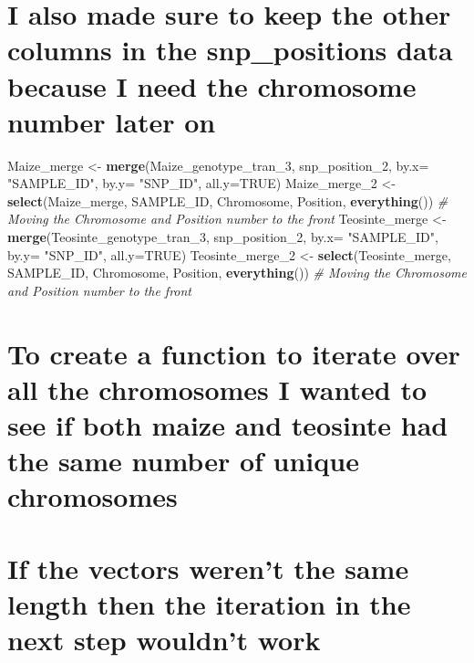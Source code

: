 \documentclass[
]{article}
\newenvironment{Shaded}{\begin{snugshade}}{\end{snugshade}}
\newcommand{\AttributeTok}[1]{\textcolor[rgb]{0.13,0.29,0.53}{#1}}
\newcommand{\CommentTok}[1]{\textcolor[rgb]{0.56,0.35,0.01}{\textit{#1}}}
\newcommand{\ConstantTok}[1]{\textcolor[rgb]{0.56,0.35,0.01}{#1}}
\newcommand{\FunctionTok}[1]{\textcolor[rgb]{0.13,0.29,0.53}{\textbf{#1}}}
\newcommand{\NormalTok}[1]{#1}
\newcommand{\OtherTok}[1]{\textcolor[rgb]{0.56,0.35,0.01}{#1}}
\newcommand{\StringTok}[1]{\textcolor[rgb]{0.31,0.60,0.02}{#1}}
\begin{document}
\section{I also made sure to keep the other columns in the
snp\_positions data because I need the chromosome number later
on}\label{i-also-made-sure-to-keep-the-other-columns-in-the-snp_positions-data-because-i-need-the-chromosome-number-later-on}

\begin{Shaded}
\begin{Highlighting}[]
\NormalTok{Maize\_merge }\OtherTok{\textless{}{-}} \FunctionTok{merge}\NormalTok{(Maize\_genotype\_tran\_3, snp\_position\_2, }\AttributeTok{by.x=} \StringTok{"SAMPLE\_ID"}\NormalTok{, }\AttributeTok{by.y=} \StringTok{"SNP\_ID"}\NormalTok{, }\AttributeTok{all.y=}\ConstantTok{TRUE}\NormalTok{)}
\NormalTok{Maize\_merge\_2 }\OtherTok{\textless{}{-}} \FunctionTok{select}\NormalTok{(Maize\_merge, SAMPLE\_ID, Chromosome, Position, }\FunctionTok{everything}\NormalTok{()) }\CommentTok{\# Moving the Chromosome and Position number to the front}
\NormalTok{Teosinte\_merge }\OtherTok{\textless{}{-}} \FunctionTok{merge}\NormalTok{(Teosinte\_genotype\_tran\_3, snp\_position\_2, }\AttributeTok{by.x=} \StringTok{"SAMPLE\_ID"}\NormalTok{, }\AttributeTok{by.y=} \StringTok{"SNP\_ID"}\NormalTok{, }\AttributeTok{all.y=}\ConstantTok{TRUE}\NormalTok{)}
\NormalTok{Teosinte\_merge\_2 }\OtherTok{\textless{}{-}} \FunctionTok{select}\NormalTok{(Teosinte\_merge, SAMPLE\_ID, Chromosome, Position, }\FunctionTok{everything}\NormalTok{()) }\CommentTok{\# Moving the Chromosome and Position number to the front}
\end{Highlighting}
\end{Shaded}

\section{To create a function to iterate over all the chromosomes I
wanted to see if both maize and teosinte had the same number of unique
chromosomes}\label{to-create-a-function-to-iterate-over-all-the-chromosomes-i-wanted-to-see-if-both-maize-and-teosinte-had-the-same-number-of-unique-chromosomes}

\section{If the vectors weren't the same length then the iteration in
the next step wouldn't
work}\label{if-the-vectors-werent-the-same-length-then-the-iteration-in-the-next-step-wouldnt-work}
\end{document}
